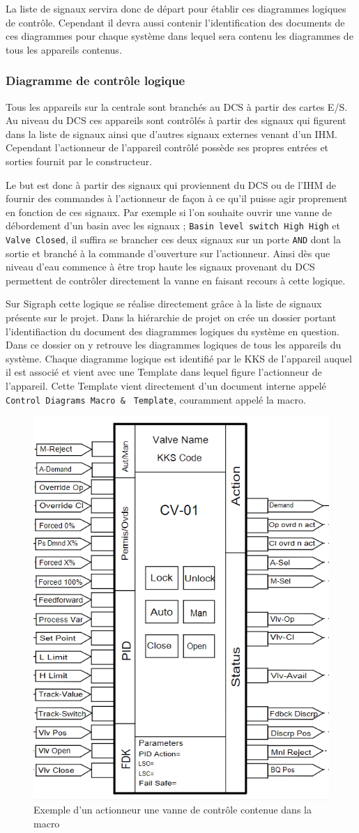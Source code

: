 \documentclass[11pt, openright]{book}
\begin{document}
La liste de signaux servira donc de départ pour établir ces diagrammes logiques de contrôle. Cependant il devra aussi contenir l'identification des documents de ces diagrammes pour chaque système dans lequel sera contenu les diagrammes de tous les appareils contenus.

\subsubsection{Diagramme de contrôle logique}

Tous les appareils sur la centrale sont branchés au DCS à partir des cartes E/S. Au niveau du DCS ces appareils sont contrôlés à partir des signaux qui figurent dans la liste de signaux ainsi que d'autres signaux externes venant d'un IHM. Cependant l'actionneur de l'appareil contrôlé possède ses propres entrées et sorties fournit par le constructeur.

Le but est donc à partir des signaux qui proviennent du DCS ou de l'IHM de fournir des commandes à l'actionneur de façon à ce qu'il puisse agir proprement en fonction de ces signaux. Par exemple si l'on souhaite ouvrir une vanne de débordement d'un basin avec les signaux ; \texttt{Basin level switch High High} et \texttt{Valve Closed}, il suffira se brancher ces deux signaux sur un porte \texttt{AND} dont la sortie et branché à la commande d'ouverture sur l'actionneur. Ainsi dès que niveau d'eau commence à être trop haute les signaux provenant du DCS permettent de contrôler directement la vanne en faisant recours à cette logique.

Sur Sigraph cette logique se réalise directement grâce à la liste de signaux présente sur le projet. Dans la hiérarchie de projet on crée un dossier portant l'identifiaction du document des diagrammes logiques du système en question. Dans ce dossier on y retrouve les diagrammes logiques de tous les appareils du système. Chaque diagramme logique est identifié par le KKS de l'appareil auquel il est associé et vient avec une Template dans lequel figure l'actionneur de l'appareil. Cette Template vient directement d'un document interne appelé \texttt{Control Diagrams Macro \& } \texttt{Temp\-late}, couramment appelé la macro.


\begin{figure}[ht!]
    \centering
    \includegraphics[height=0.6\textwidth]{./object/macro.png}
    \caption{Exemple d'un actionneur une vanne de contrôle contenue dans la macro}
\end{figure}
\end{document}
